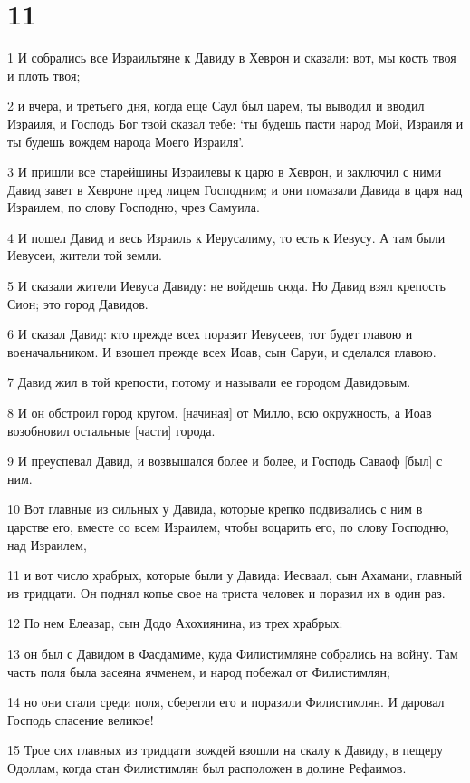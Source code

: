 \chapter{11}

\par 1 И собрались все Израильтяне к Давиду в Хеврон и сказали: вот, мы кость твоя и плоть твоя;
\par 2 и вчера, и третьего дня, когда еще Саул был царем, ты выводил и вводил Израиля, и Господь Бог твой сказал тебе: `ты будешь пасти народ Мой, Израиля и ты будешь вождем народа Моего Израиля'.
\par 3 И пришли все старейшины Израилевы к царю в Хеврон, и заключил с ними Давид завет в Хевроне пред лицем Господним; и они помазали Давида в царя над Израилем, по слову Господню, чрез Самуила.
\par 4 И пошел Давид и весь Израиль к Иерусалиму, то есть к Иевусу. А там были Иевусеи, жители той земли.
\par 5 И сказали жители Иевуса Давиду: не войдешь сюда. Но Давид взял крепость Сион; это город Давидов.
\par 6 И сказал Давид: кто прежде всех поразит Иевусеев, тот будет главою и военачальником. И взошел прежде всех Иоав, сын Саруи, и сделался главою.
\par 7 Давид жил в той крепости, потому и называли ее городом Давидовым.
\par 8 И он обстроил город кругом, [начиная] от Милло, всю окружность, а Иоав возобновил остальные [части] города.
\par 9 И преуспевал Давид, и возвышался более и более, и Господь Саваоф [был] с ним.
\par 10 Вот главные из сильных у Давида, которые крепко подвизались с ним в царстве его, вместе со всем Израилем, чтобы воцарить его, по слову Господню, над Израилем,
\par 11 и вот число храбрых, которые были у Давида: Иесваал, сын Ахамани, главный из тридцати. Он поднял копье свое на триста человек и поразил их в один раз.
\par 12 По нем Елеазар, сын Додо Ахохиянина, из трех храбрых:
\par 13 он был с Давидом в Фасдамиме, куда Филистимляне собрались на войну. Там часть поля была засеяна ячменем, и народ побежал от Филистимлян;
\par 14 но они стали среди поля, сберегли его и поразили Филистимлян. И даровал Господь спасение великое!
\par 15 Трое сих главных из тридцати вождей взошли на скалу к Давиду, в пещеру Одоллам, когда стан Филистимлян был расположен в долине Рефаимов.
